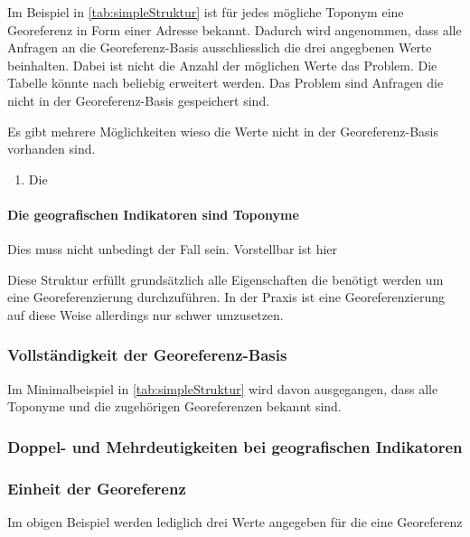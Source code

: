 				Im Beispiel in \ref{tab:simpleStruktur} ist für jedes mögliche Toponym eine Georeferenz in Form einer Adresse bekannt.
				Dadurch wird angenommen, dass alle Anfragen an die Georeferenz-Basis ausschliesslich die drei angegbenen Werte beinhalten. 
				Dabei ist nicht die Anzahl der möglichen Werte das Problem.
				Die Tabelle könnte nach beliebig erweitert werden.
				Das Problem sind Anfragen die nicht in der Georeferenz-Basis gespeichert sind.

				Es gibt mehrere Möglichkeiten wieso die Werte nicht in der Georeferenz-Basis vorhanden sind. 

				\begin{enumerate}
				 	\item Die  
				 \end{enumerate} 



			\paragraph{Die geografischen Indikatoren sind Toponyme}

				Dies muss nicht unbedingt der Fall sein. 
				Vorstellbar ist hier 

			Diese Struktur erfüllt grundsätzlich alle Eigenschaften die benötigt werden um eine Georeferenzierung durchzuführen. 
			In der Praxis ist eine Georeferenzierung auf diese Weise allerdings nur schwer umzusetzen.

			\subsubsection{Vollständigkeit der Georeferenz-Basis} 

				Im Minimalbeispiel in \ref{tab:simpleStruktur} wird davon ausgegangen, dass alle Toponyme und die zugehörigen Georeferenzen bekannt sind.		

			\subsubsection{Doppel- und Mehrdeutigkeiten bei geografischen Indikatoren} 



			\subsubsection{Einheit der Georeferenz} 


			Im obigen Beispiel werden lediglich drei Werte angegeben für die eine Georeferenz 

